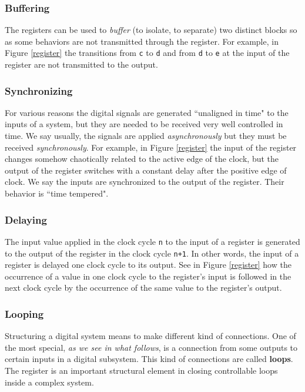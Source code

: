 \subsubsection{Buffering}
The registers can be used to {\em buffer} (to isolate, to
separate) two distinct blocks so as some behaviors are not
transmitted through the register. For example, in Figure
\ref{register} the transitions from {\tt c} to {\tt d} and from
{\tt d} to {\tt e} at the input of the register are not
transmitted to the output.

\subsubsection{Synchronizing}
For various reasons the digital signals are generated ``unaligned
in time" to the inputs of a system, but they are needed to be
received very well controlled in time. We say usually, the signals
are applied {\em asynchronously} but they must be received {\em
synchronously}.  For example, in Figure \ref{register} the input
of the register changes somehow chaotically related to the active
edge of the clock, but the output of the register switches with a
constant delay after the positive edge of clock. We say the inputs
are synchronized to the output of the register. Their behavior is
``time tempered".

\subsubsection{Delaying}
The input value applied in the clock cycle {\tt n} to the input of
a register is generated to the output of the register in the clock
cycle {\tt n+1}. In other words, the input of a register is
delayed one clock cycle to its output. See in Figure
\ref{register} how the occurrence of a value in one clock cycle to
the register's input is followed in the next clock cycle by the
occurrence of the same value to the register's output.

\subsubsection{Looping}
Structuring a digital system means to make different kind of
connections. One of the most special, {\em as we see in what
follows}, is a connection from some outputs to certain inputs in a
digital subsystem. This kind of connections are called {\bf
loops}. The register is an important structural element in closing
controllable loops inside a complex system.

